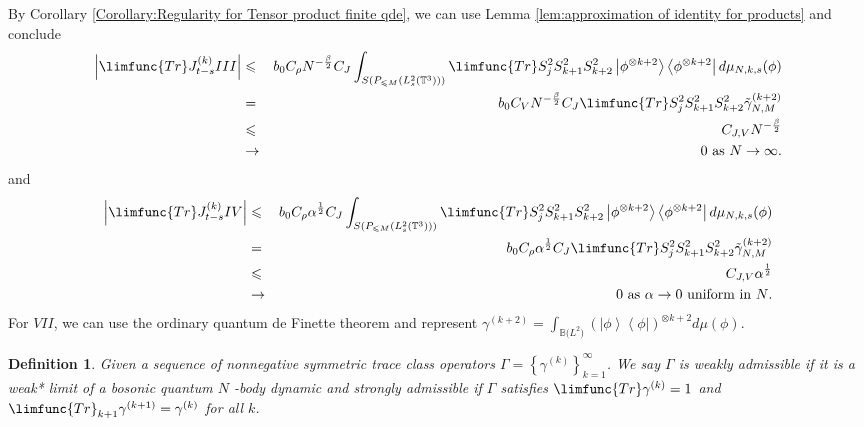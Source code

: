 \documentclass[12pt,letterpaper,leqno]{amsart}
\theoremstyle{plain}
\newtheorem{definition}{Definition}
\numberwithin{equation}{section}
\numberwithin{theorem}{section}
\numberwithin{proposition}{section}
\numberwithin{lemma}{section}
\numberwithin{corollary}{section}
\begin{document}
By Corollary \ref{Corollary:Regularity for Tensor product finite qde}, we
can use Lemma \ref{lem:approximation of identity for products} and conclude%
\begin{eqnarray*}
\left\vert \limfunc{Tr}J_{t-s}^{(k)}III\right\vert &\leqslant &b_{0}C_{\rho
}N^{-\frac{\beta }{2}}C_{J}\int_{S(P_{\leqslant M}\left( L_{s}^{2}(\mathbb{T}%
^{3})\right) )}\limfunc{Tr}S_{j}^{2}S_{k+1}^{2}S_{k+2}^{2}\left\vert \phi
^{\otimes k+2}\right\rangle \left\langle \phi ^{\otimes k+2}\right\vert d\mu
_{N,k,s}(\phi ) \\
&=&b_{0}C_{V}N^{-\frac{\beta }{2}}C_{J}\limfunc{Tr}%
S_{j}^{2}S_{k+1}^{2}S_{k+2}^{2}\tilde{\gamma}_{N,M}^{(k+2)} \\
&\leqslant &C_{J,V}N^{-\frac{\beta }{2}} \\
&\rightarrow &0\text{ as }N\rightarrow \infty \text{.}
\end{eqnarray*}%
and%
\begin{eqnarray*}
\left\vert \limfunc{Tr}J_{t-s}^{(k)}IV\right\vert &\leqslant &b_{0}C_{\rho
}\alpha ^{\frac{1}{2}}C_{J}\int_{S(P_{\leqslant M}\left( L_{s}^{2}(\mathbb{T}%
^{3})\right) )}\limfunc{Tr}S_{j}^{2}S_{k+1}^{2}S_{k+2}^{2}\left\vert \phi
^{\otimes k+2}\right\rangle \left\langle \phi ^{\otimes k+2}\right\vert d\mu
_{N,k,s}(\phi ) \\
&=&b_{0}C_{\rho }\alpha ^{\frac{1}{2}}C_{J}\limfunc{Tr}%
S_{j}^{2}S_{k+1}^{2}S_{k+2}^{2}\tilde{\gamma}_{N,M}^{(k+2)} \\
&\leqslant &C_{J,V}\alpha ^{\frac{1}{2}} \\
&\rightarrow &0\text{ as }\alpha \rightarrow 0\text{ uniform in }N\text{.}
\end{eqnarray*}%
For $VII$, we can use the ordinary quantum de Finette theorem and represent $%
\gamma ^{(k+2)}=\int_{\mathbb{B(}L^{2}\mathbb{)}}\left( \left\vert \phi
\right\rangle \left\langle \phi \right\vert \right) ^{\otimes k+2}d\mu (\phi
)$.

\begin{definition}
\label{def:Admissible}Given a sequence of nonnegative symmetric trace class
operators $\Gamma =\left\{ \gamma ^{(k)}\right\} _{k=1}^{\infty }$. We say $%
\Gamma $ is weakly admissible if it is a weak* limit of a bosonic quantum $N$%
-body dynamic and strongly admissible if $\Gamma $ satisfies $\limfunc{Tr}%
\gamma ^{(k)}=1$ and $\limfunc{Tr}_{k+1}\gamma ^{(k+1)}=\gamma ^{(k)}$ for
all $k$.
\end{definition}
\end{document}
